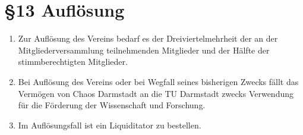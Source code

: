 \section*{§13 Auflösung}
\begin{enumerate}
\item Zur Auflösung des Vereins bedarf es der Dreiviertelmehrheit der an
der Mitgliederversammlung teilnehmenden Mitglieder und der Hälfte
der stimmberechtigten Mitglieder.
\item Bei Auflösung des Vereins oder bei Wegfall seines bisherigen Zwecks
fällt das Vermögen von Chaos Darmstadt an die TU Darmstadt zwecks
Verwendung für die Förderung der Wissenschaft und Forschung.
\item Im Auflösungsfall ist ein Liquiditator zu bestellen.
\end{enumerate}
